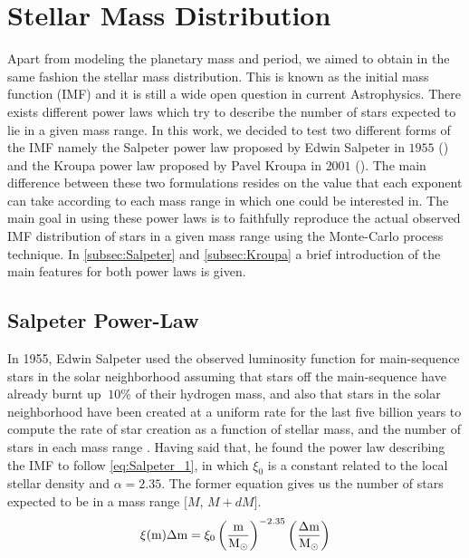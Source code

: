 \section{Stellar Mass Distribution}

Apart from modeling the planetary mass and period, we aimed to obtain in the same fashion the stellar mass distribution. This is known as the initial mass function (IMF) and it is still a wide open question in current Astrophysics. There exists different power laws which try to describe the number of stars expected to lie in a given mass range. In this work, we decided to test two different forms of the IMF namely the Salpeter power law proposed by Edwin Salpeter in $1955$ (\citeyear{1955ApJ...121..161S}) and the Kroupa power law proposed by Pavel Kroupa in $2001$ (\citeyear{2001MNRAS.322..231K}). The main difference between these two formulations resides on the value that each exponent can take according to each mass range in which one could be interested in. The main goal in using these power laws is to faithfully reproduce the actual observed IMF distribution of stars in a given mass range using the Monte-Carlo process technique. In \autoref{subsec:Salpeter} and \autoref{subsec:Kroupa} a brief introduction of the main features for both power laws is given.    

\subsection{Salpeter Power-Law}\label{subsec:Salpeter}

In 1955, Edwin Salpeter used the observed luminosity function for main-sequence stars in the solar neighborhood assuming that stars off the main-sequence have already burnt up $~10\%$ of their hydrogen mass, and also that stars in the solar neighborhood have been created at a uniform rate for the last five billion years to compute the rate of star creation as a function of stellar mass, and the number of stars in each mass range \citeyear{1955ApJ...121..161S}. Having said that, he found the power law describing the IMF to follow \autoref{eq:Salpeter_1}, in which $\xi_0$ is a constant related to the local stellar density and $\alpha = 2.35$. The former equation gives us the number of stars expected to be in a mass range $[M$, $M + dM]$.\\ 

\begingroup
\Large
\begin{equation}
  \xi(\textnormal{m})\Delta \textnormal{m} = \xi_0 \left(\frac{\textnormal{m}}{\textnormal{M}_\odot}\right)^{-2.35} \left(\frac{\Delta \textnormal{m}}{\textnormal{M}_\odot}\right)
 \label{eq:Salpeter_1}
\end{equation}
\endgroup\\

